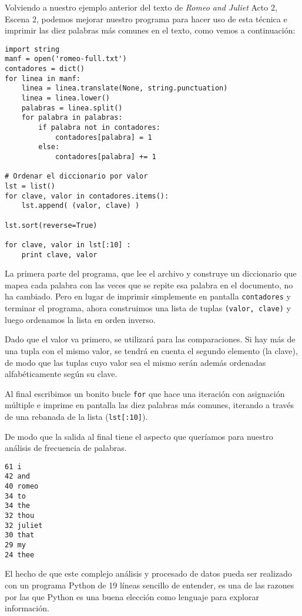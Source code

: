 Volviendo a nuestro ejemplo anterior del texto de \emph{Romeo and Juliet}
Acto 2, Escena 2, podemos mejorar nuestro programa para hacer uso de esta técnica e
imprimir las diez palabras más comunes en el texto, como vemos a continuación:

\beforeverb
\begin{verbatim}
import string
manf = open('romeo-full.txt')
contadores = dict()
for linea in manf:
    linea = linea.translate(None, string.punctuation)
    linea = linea.lower()
    palabras = linea.split()
    for palabra in palabras:
        if palabra not in contadores:
            contadores[palabra] = 1
        else:
            contadores[palabra] += 1

# Ordenar el diccionario por valor
lst = list()
for clave, valor in contadores.items():
    lst.append( (valor, clave) )

lst.sort(reverse=True)

for clave, valor in lst[:10] :
    print clave, valor
\end{verbatim}
\afterverb
%
La primera parte del programa, que lee el archivo y construye
un diccionario que mapea cada palabra con las veces que se repite esa palabra en el
documento, no ha cambiado. Pero en lugar de imprimir simplemente en pantalla
{\tt contadores} y terminar el programa, ahora construimos una
lista de tuplas {\tt (valor, clave)} y luego ordenamos la lista en orden inverso.

Dado que el valor va primero, se utilizará para las comparaciones.
Si hay más de una tupla con el mismo valor, se tendrá en cuenta
el segundo elemento (la clave), de modo que las tuplas cuyo valor sea
el mismo serán además ordenadas alfabéticamente según su clave.

Al final escribimos un bonito bucle {\tt for} que hace una iteración con
asignación múltiple e imprime en pantalla las diez palabras más comunes,
iterando a través de una rebanada de la lista ({\tt lst[:10]}).

De modo que la salida al final tiene el aspecto que queríamos para
nuestro análisis de frecuencia de palabras.

\beforeverb
\begin{verbatim}
61 i
42 and
40 romeo
34 to
34 the
32 thou
32 juliet
30 that
29 my
24 thee
\end{verbatim}
\afterverb
%
El hecho de que este complejo análisis y procesado de datos
pueda ser realizado con un programa Python de 19 líneas
sencillo de entender, es una de las razones por las que Python es una buena elección
como lenguaje para explorar información.

